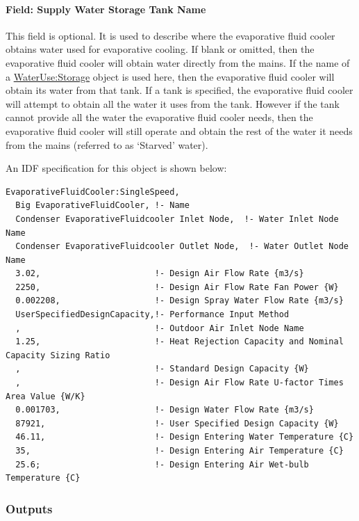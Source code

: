 \paragraph{Field: Supply Water Storage Tank Name}\label{field-supply-water-storage-tank-name-4}

This field is optional. It is used to describe where the evaporative fluid cooler obtains water used for evaporative cooling. If blank or omitted, then the evaporative fluid cooler will obtain water directly from the mains. If the name of a \hyperref[waterusestorage]{WaterUse:Storage} object is used here, then the evaporative fluid cooler will obtain its water from that tank. If a tank is specified, the evaporative fluid cooler will attempt to obtain all the water it uses from the tank. However if the tank cannot provide all the water the evaporative fluid cooler needs, then the evaporative fluid cooler will still operate and obtain the rest of the water it needs from the mains (referred to as `Starved' water).

An IDF specification for this object is shown below:

\begin{lstlisting}
EvaporativeFluidCooler:SingleSpeed,
  Big EvaporativeFluidCooler, !- Name
  Condenser EvaporativeFluidcooler Inlet Node,  !- Water Inlet Node Name
  Condenser EvaporativeFluidcooler Outlet Node,  !- Water Outlet Node Name
  3.02,                       !- Design Air Flow Rate {m3/s}
  2250,                       !- Design Air Flow Rate Fan Power {W}
  0.002208,                   !- Design Spray Water Flow Rate {m3/s}
  UserSpecifiedDesignCapacity,!- Performance Input Method
  ,                           !- Outdoor Air Inlet Node Name
  1.25,                       !- Heat Rejection Capacity and Nominal Capacity Sizing Ratio
  ,                           !- Standard Design Capacity {W}
  ,                           !- Design Air Flow Rate U-factor Times Area Value {W/K}
  0.001703,                   !- Design Water Flow Rate {m3/s}
  87921,                      !- User Specified Design Capacity {W}
  46.11,                      !- Design Entering Water Temperature {C}
  35,                         !- Design Entering Air Temperature {C}
  25.6;                       !- Design Entering Air Wet-bulb Temperature {C}
\end{lstlisting}

\subsubsection{Outputs}\label{outputs-6-001}

